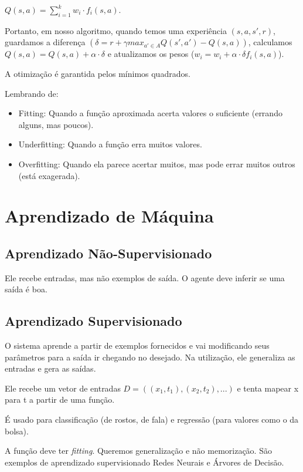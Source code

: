 \documentclass[12pt,letterpaper]{article}
\begin{document}
	\begin{center}
		$Q(s,a) = \sum_{i=1}^{k} w_i\cdot f_i(s,a)$.
	\end{center}
	
	Portanto, em nosso algoritmo, quando temos uma experiência $(s, a, s', r)$, guardamos a diferença $(\delta = r + \gamma max_{a' \in A} Q(s', a') - Q(s,a))$, calculamos $Q(s, a) = Q(s, a) + \alpha\cdot \delta$ e atualizamos os pesos ($w_i = w_i + \alpha \cdot \delta f_i(s,a)$).
	
	A otimização é garantida pelos mínimos quadrados. 
	
	Lembrando de:
	
	\begin{itemize}
		\item Fitting: Quando a função aproximada acerta valores o suficiente (errando alguns, mas poucos).
		\item Underfitting: Quando a função erra muitos valores.
		\item Overfitting: Quando ela parece acertar muitos, mas pode errar muitos outros (está exagerada).
	\end{itemize}
	
	\section*{Aprendizado de Máquina}
	
	\subsection*{Aprendizado Não-Supervisionado}
	
	Ele recebe entradas, mas não exemplos de saída. O agente deve inferir se uma saída é boa.
		
	\subsection*{Aprendizado Supervisionado}
	
	O sistema aprende a partir de exemplos fornecidos e vai modificando seus parâmetros para a saída ir chegando no desejado. Na utilização, ele generaliza as entradas e gera as saídas.
	
	Ele recebe um vetor de entradas $D = ((x_1, t_1), (x_2, t_2), ...)$ e tenta mapear x para t a partir de uma função.
	
	É usado para classificação (de rostos, de fala) e regressão (para valores como o da bolsa).
	
	A função deve ter \textit{fitting}. Queremos generalização e não memorização. São exemplos de aprendizado supervisionado Redes Neurais e Árvores de Decisão.
	
\end{document}
